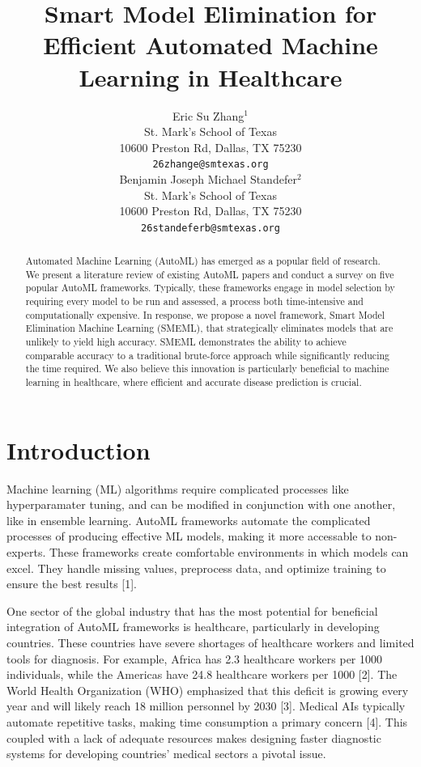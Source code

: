 \documentclass{article}
\title{Smart Model Elimination for Efficient Automated Machine Learning in Healthcare}
\author{%
  Eric Su Zhang$^1$ \\
  St. Mark's School of Texas\\
  10600 Preston Rd, Dallas, TX 75230\\
  \texttt{26zhange@smtexas.org} \\
  \And
  Benjamin Joseph Michael Standefer$^2$ \\
  St. Mark's School of Texas \\
  10600 Preston Rd, Dallas, TX 75230 \\
  \texttt{26standeferb@smtexas.org} \\
}
\begin{document}
\maketitle


\begin{abstract}
  Automated Machine Learning (AutoML) has emerged as a popular field of research. We present a literature review of existing AutoML papers and conduct a survey on five popular AutoML frameworks. Typically, these frameworks engage in model selection by requiring every model to be run and assessed, a process both time-intensive and computationally expensive. In response, we propose a novel framework, Smart Model Elimination Machine Learning (SMEML), that strategically eliminates models that are unlikely to yield high accuracy. SMEML demonstrates the ability to achieve comparable accuracy to a traditional brute-force approach while significantly reducing the time required. We also believe this innovation is particularly beneficial to machine learning in healthcare, where efficient and accurate disease prediction is crucial. 
\end{abstract}


\section{Introduction}

Machine learning (ML) algorithms require complicated processes like hyperparamater tuning, and can be modified in conjunction with one another, like in ensemble learning. AutoML frameworks automate the complicated processes of producing effective ML models, making it more accessable to non-experts. These frameworks create comfortable environments in which models can excel. They handle missing values, preprocess data, and optimize training to ensure the best results [1].

One sector of the global industry that has the most potential for beneficial integration of AutoML frameworks is healthcare, particularly in developing countries. These countries have severe shortages of healthcare workers and limited tools for diagnosis. For example, Africa has 2.3 healthcare workers per 1000 individuals, while the Americas have 24.8 healthcare workers per 1000 [2]. The World Health Organization (WHO) emphasized that this deficit is growing every year and will likely reach 18 million personnel by 2030 [3]. Medical AIs typically automate repetitive tasks, making time consumption a primary concern [4]. This coupled with a lack of adequate resources makes designing faster diagnostic systems for developing countries' medical sectors a pivotal issue. 
\end{document}
